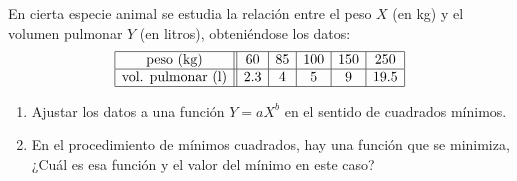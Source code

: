 \begin{enunciado}{\ejExtra}
  En cierta especie animal se estudia la relación entre el peso $X$ (en kg) y el volumen pulmonar $Y$ (en litros), obteniéndose
  los datos:
  $$
    \begin{array}{|c||c|c|c|c|c|}
      \hline
      \text{peso (kg)}         & 60  & 85 & 100 & 150 & 250  \\ \hline
      \text{vol. pulmonar (l)} & 2.3 & 4  & 5   & 9   & 19.5 \\ \hline
    \end{array}
  $$
  \begin{enumerate}[label=(\alph*)]
    \item Ajustar los datos a una función $Y = a X^b$ en el sentido de cuadrados mínimos.
    \item En el procedimiento de mínimos cuadrados, hay una función que se minimiza, ¿Cuál es
          esa función y el valor del mínimo en este caso?
  \end{enumerate}
\end{enunciado}

